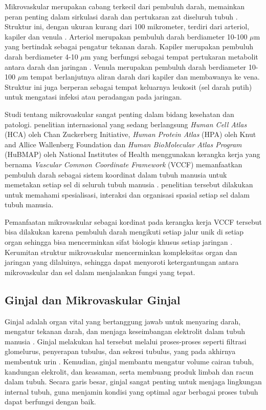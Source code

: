 \noindent Mikrovaskular merupakan cabang terkecil dari pembuluh darah, memainkan peran penting dalam sirkulasi darah dan pertukaran zat diseluruh tubuh \cite{rusanova_role_2022}. Struktur ini, dengan ukuran kurang dari 100 mikrometer, terdiri dari arteriol, kapiler dan venula \cite{mescher_junqueiras_2021,pepe_microvascular_2023}. Arteriol merupakan pembuluh darah berdiameter 10-100 $\mu$m yang bertindak sebagai pengatur tekanan darah. Kapiler merupakan pembuluh darah berdiameter 4-10 $\mu$m yang berfungsi sebagai tempat pertukaran metabolit antara darah dan jaringan \cite{haffner_emerging_2023}. Venula merupakan pembuluh darah berdiameter 10-100 $\mu$m tempat berlanjutnya aliran darah dari kapiler dan membawanya ke vena. Struktur ini juga berperan sebagai tempat keluarnya leukosit (sel darah putih) untuk mengatasi infeksi atau peradangan pada jaringan.


\noindent Studi tentang mikrovaskular sangat penting dalam bidang kesehatan dan patologi. penelitian internasional yang sedang berlangsung \textit{Human Cell Atlas }(HCA) oleh Chan Zuckerberg Initiative, \textit{Human Protein Atlas} (HPA) oleh Knut and Allice Wallenberg Foundation dan \textit{Human BioMolecular Atlas Program} (HuBMAP) oleh National Institutes of Health menggunakan kerangka kerja yang bernama \textit{Vascular Common Coordinate Framework} (VCCF) memanfaatkan pembuluh darah sebagai sistem koordinat dalam tubuh manusia untuk memetakan setiap sel di seluruh tubuh manusia \cite{weber_considerations_2020}. penelitian tersebut dilakukan untuk memahami spesialisasi, interaksi dan organisasi spasial setiap sel dalam tubuh manusia.

\noindent Pemanfaatan mikrovaskular sebagai kordinat pada kerangka kerja VCCF tersebut bisa dilakukan karena pembuluh darah  mengikuti setiap jalur unik di setiap organ sehingga bisa mencerminkan sifat biologis khusus setiap jaringan \cite{weber_considerations_2020}. Kerumitan struktur mikrovaskular mencerminkan kompleksitas organ dan jaringan yang dilaluinya, sehingga dapat menyoroti ketergantungan antara mikrovaskular dan sel dalam menjalankan fungsi yang tepat. 



\subsection{Ginjal dan Mikrovaskular Ginjal}


\noindent Ginjal adalah organ vital yang bertanggung jawab untuk menyaring darah, mengatur tekanan darah, dan menjaga keseimbangan elektrolit dalam tubuh manusia \cite{sultan_microvasculature_2023,ito_s-27-1_2023,bagarao_renal_2023}. %
 Ginjal melakukan hal tersebut melalui proses-proses seperti filtrasi glomelurus, penyerapan tubulus, dan sekresi tubulus, yang pada akhirnya membentuk urin \cite{auctores_publishing_llc_what_2021}. Kemudian, ginjal membantu mengatur volume cairan tubuh, kandungan elekrolit, dan keasaman, serta membuang produk limbah dan racun dalam tubuh. Secara garis besar, ginjal sangat penting untuk menjaga lingkungan internal tubuh, guna menjamin kondisi yang optimal agar berbagai proses tubuh dapat berfungsi dengan baik.
 

